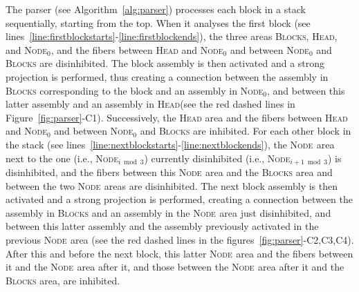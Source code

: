 \documentclass[letterpaper]{article}
\newcommand{\workzone}[1]{\mbox{\textsc{Node}$_{#1}$}\xspace}
\newcommand{\blocks}{\textsc{Blocks}\xspace}
\newcommand{\headzone}{\textsc{Head}\xspace}
\begin{document}
The parser (see Algorithm~\ref{alg:parser}) processes each block in a stack sequentially, starting from the top. When it analyses the first block (see  lines~\ref{line:firstblockstarts}-\ref{line:firstblockends}), the three areas \blocks, \headzone, and \workzone{0}, and the fibers between \headzone and \workzone{0} and between \workzone{0} and \blocks are disinhibited. The block assembly is then activated and a strong projection is performed, thus creating a connection between the assembly in \blocks corresponding to the block and an assembly in \workzone{0}, and between this latter assembly and an assembly in \headzone (see the red dashed lines in Figure~\ref{fig:parser}-C1). Successively, the \headzone area and the fibers between \headzone and \workzone{0} and between \workzone{0} and \blocks are inhibited. For each other block in the stack (see  lines~\ref{line:nextblockstarts}-\ref{line:nextblockends}), the \workzone{} area next to the one (i.e., \workzone{i \bmod 3}) currently disinhibited (i.e., \workzone{i+1 \bmod 3}) is disinhibited, and the fibers between this \workzone{} area and the \blocks area and between the two \workzone{} areas are disinhibited. The next block assembly is then activated and a strong projection is performed, creating a connection between the assembly in \blocks and an assembly in the \workzone{} area just disinhibited, and between this latter assembly and the assembly previously activated in the previous \workzone{} area (see the red dashed lines in the figures~\ref{fig:parser}-C2,C3,C4). After this and before the next block, this latter \workzone{} area and the fibers between it and the \workzone{} area after it, and those between the \workzone{} area after it and the \blocks area, are inhibited.
\end{document}
